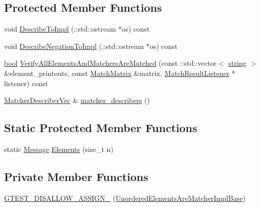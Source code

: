 \subsection*{Protected Member Functions}
\begin{DoxyCompactItemize}
\item 
void \hyperlink{classtesting_1_1internal_1_1UnorderedElementsAreMatcherImplBase_a40318adf9a89d830a26a96b2eb06b4e3}{Describe\+To\+Impl} (\+::std\+::ostream $\ast$os) const
\item 
void \hyperlink{classtesting_1_1internal_1_1UnorderedElementsAreMatcherImplBase_ab3ca5ae4aef146b093a3fb35f53d1a38}{Describe\+Negation\+To\+Impl} (\+::std\+::ostream $\ast$os) const
\item 
\hyperlink{classbool}{bool} \hyperlink{classtesting_1_1internal_1_1UnorderedElementsAreMatcherImplBase_a515ec900bd84fe4d28e3ccf55db25822}{Verify\+All\+Elements\+And\+Matchers\+Are\+Matched} (const \+::std\+::vector$<$ \hyperlink{namespacetesting_1_1internal_a8e8ff5b11e64078831112677156cb111}{string} $>$ \&element\+\_\+printouts, const \hyperlink{classtesting_1_1internal_1_1MatchMatrix}{Match\+Matrix} \&matrix, \hyperlink{classtesting_1_1MatchResultListener}{Match\+Result\+Listener} $\ast$listener) const
\item 
\hyperlink{classtesting_1_1internal_1_1UnorderedElementsAreMatcherImplBase_a81ca7ce793d4b25ce2a7d3e28b48cd64}{Matcher\+Describer\+Vec} \& \hyperlink{classtesting_1_1internal_1_1UnorderedElementsAreMatcherImplBase_a04d4adc809d9c06331f8dbb67b879ac0}{matcher\+\_\+describers} ()
\end{DoxyCompactItemize}
\subsection*{Static Protected Member Functions}
\begin{DoxyCompactItemize}
\item 
static \hyperlink{classtesting_1_1Message}{Message} \hyperlink{classtesting_1_1internal_1_1UnorderedElementsAreMatcherImplBase_ab6d5a2342e07730b913f419cf662d16a}{Elements} (size\+\_\+t n)
\end{DoxyCompactItemize}
\subsection*{Private Member Functions}
\begin{DoxyCompactItemize}
\item 
\hyperlink{classtesting_1_1internal_1_1UnorderedElementsAreMatcherImplBase_aeefc48c43ed3693c8f37df816efa0e2b}{G\+T\+E\+S\+T\+\_\+\+D\+I\+S\+A\+L\+L\+O\+W\+\_\+\+A\+S\+S\+I\+G\+N\+\_\+} (\hyperlink{classtesting_1_1internal_1_1UnorderedElementsAreMatcherImplBase}{Unordered\+Elements\+Are\+Matcher\+Impl\+Base})
\end{DoxyCompactItemize}
